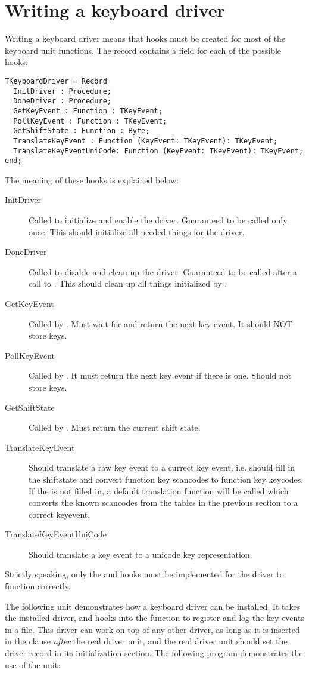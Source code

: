 \section{Writing a keyboard driver}
\label{se:kbddriver}
Writing a keyboard driver means that hooks must be created for most of the 
keyboard unit functions. The  record contains a field
for each of the possible hooks:
\begin{verbatim}
TKeyboardDriver = Record
  InitDriver : Procedure;
  DoneDriver : Procedure;
  GetKeyEvent : Function : TKeyEvent;
  PollKeyEvent : Function : TKeyEvent;
  GetShiftState : Function : Byte;
  TranslateKeyEvent : Function (KeyEvent: TKeyEvent): TKeyEvent;
  TranslateKeyEventUniCode: Function (KeyEvent: TKeyEvent): TKeyEvent;
end;
\end{verbatim}
The meaning of these hooks is explained below:
\begin{description}
\item[InitDriver] Called to initialize and enable the driver. 
Guaranteed to be called only once. This should initialize all needed things
for the driver.
\item[DoneDriver] Called to disable and clean up the driver. Guaranteed to be
called after a call to . This should clean up all
things initialized by .
\item[GetKeyEvent] Called by . Must wait for and return the
next key event. It should NOT store keys.
\item[PollKeyEvent] Called by . It must return the next key
event if there is one. Should not store keys. 
\item[GetShiftState] Called by .  Must return the current
shift state.
\item[TranslateKeyEvent] Should translate a raw key event to a currect
key event, i.e. should fill in the shiftstate and convert function key
scancodes to function key keycodes. If the
 is not filled in, a default translation function
will be called which converts the known scancodes from the tables in the
previous section to a correct keyevent.
\item[TranslateKeyEventUniCode] Should translate a key event to a unicode key
representation. 
\end{description}
Strictly speaking, only the  and 
hooks must be implemented for the driver to function correctly. 

The following unit demonstrates how a keyboard driver can be installed.
It takes the installed driver, and hooks into the 
function to register and log the key events in a file. This driver
can work on top of any other driver, as long as it is inserted in the 
 clause {\em after} the real driver unit, and the real driver unit
should set the driver record in its initialization section.
The following program demonstrates the use of the unit:
